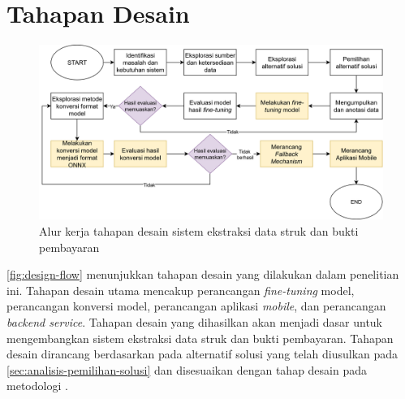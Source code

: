 \section{Tahapan Desain}
\label{sec:tahapan-desain}
\begin{figure}[htbp]
    \centering
    \includegraphics[width=\textwidth]{images/design-flow.png}
    \caption{Alur kerja tahapan desain sistem ekstraksi data struk dan bukti pembayaran}
    \label{fig:design-flow}
\end{figure}

\autoref{fig:design-flow} menunjukkan tahapan desain yang dilakukan dalam penelitian ini. Tahapan desain utama mencakup perancangan \emph{fine-tuning} model, perancangan konversi model, perancangan aplikasi \emph{mobile}, dan perancangan \emph{backend service}. Tahapan desain yang dihasilkan akan menjadi dasar untuk mengembangkan sistem ekstraksi data struk dan bukti pembayaran. Tahapan desain dirancang berdasarkan pada alternatif solusi yang telah diusulkan pada \autoref{sec:analisis-pemilihan-solusi} dan disesuaikan dengan tahap desain pada metodologi \dsrm.







   



